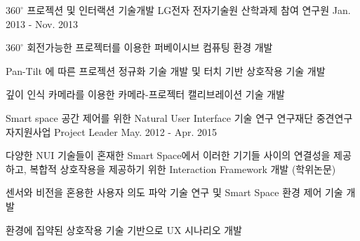 \begin{cventries}
  \cventry
    {$360^{\circ}$ 프로젝션 및 인터랙션 기술개발} %
    {LG전자 전자기술원 산학과제} %
    {참여 연구원} %
    {Jan. 2013 - Nov. 2013} %
    {
      \begin{cvitems} %
        \item {$360^{\circ}$ 회전가능한 프로젝터를 이용한 퍼베이시브 컴퓨팅 환경 개발}
        \item {Pan-Tilt 에 따른 프로젝션 정규화 기술 개발 및 터치 기반 상호작용 기술 개발}
        \item {깊이 인식 카메라를 이용한 카메라-프로젝터 캘리브레이션 기술 개발}
      \end{cvitems} 
    }

  \cventry
    {Smart space 공간 제어를 위한 Natural User Interface 기술 연구} %
    {연구재단 중견연구자지원사업} %
    {Project Leader} %
    {May. 2012 - Apr. 2015} %
    {
      \begin{cvitems} %
        \item {다양한 NUI 기술들이 혼재한 Smart Space에서 이러한 기기들 사이의 연결성을 제공하고, 복합적 상호작용을 제공하기 위한 Interaction Framework 개발 (학위논문)}
        \item {센서와 비전을 혼용한 사용자 의도 파악 기술 연구 및 Smart Space 환경 제어 기술 개발}
        \item {환경에 집약된 상호작용 기술 기반으로 UX 시나리오 개발}
      \end{cvitems}
    }


\end{cventries}
